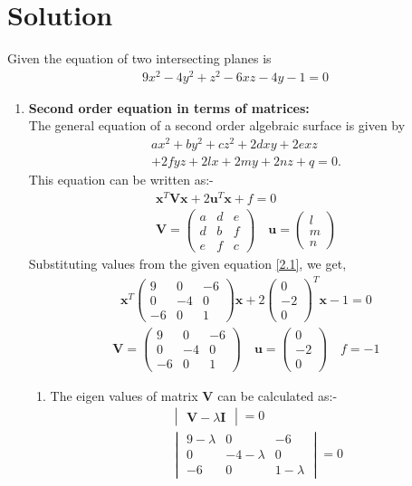 \documentclass[journal,12pt,twocolumn]{IEEEtran}
\let\vec\mathbf
\numberwithin{equation}{subsection}
\newcommand{\myvec}[1]{\ensuremath{\begin{pmatrix}#1\end{pmatrix}}}
\newcommand{\mydet}[1]{\ensuremath{\begin{vmatrix}#1\end{vmatrix}}}
\begin{document}
\section{Solution}
Given the equation of two intersecting planes is 
\begin{align}
   9x^2 -4y^2 +z^2 -6xz -4y -1 =0\label{2.1}
\end{align}
\begin{enumerate}
\item \textbf{Second order equation in terms of matrices:}\\
The general equation of a second order algebraic surface is given by
\begin{multline}
ax^2 + by^2 + cz^2 + 2dxy + 2exz \\+ 2fyz + 2lx + 2my + 2nz + q = 0.
\end{multline}
This equation can be written as:-
\begin{align}
\vec{x}^T\vec{V}\vec{x} +2 \vec{u}^T\vec{x}+f=0 \label{2.7}\\
\vec{V} = \myvec{a&d&e\\d&b&f\\e&f&c}\quad
\vec{u}= \myvec{l\\m\\n}
\end{align}
Substituting values from the given equation \eqref{2.1}, we get,
\begin{align}
\vec{x}^T\myvec{9&0&-6\\0&-4&0\\-6&0&1}\vec{x} + 2\myvec{0\\-2\\0}^T\vec{x}-1=0
\end{align}
\begin{align}
\vec{V} = \myvec{9&0&-6\\0&-4&0\\-6&0&1} \quad
\vec{u}= \myvec{0\\-2\\0} \quad f=-1
\end{align}
\begin{enumerate}
\item The eigen values of matrix $\vec{V}$ can be calculated as:-
\begin{align}
\mydet{\vec{V} - \lambda\vec{I}} = 0\\
\begin{vmatrix}9-\lambda&0&-6\\0&-4-\lambda&0\\-6&0&1-\lambda\end{vmatrix} = 0\\

\end{align}
\end{enumerate}
\end{enumerate}
\end{document}
